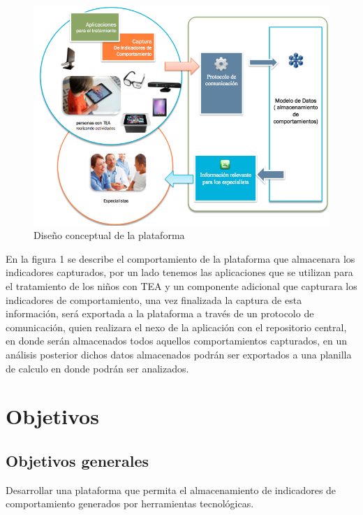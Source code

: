 \documentclass[12pt,letterpaper]{article}
\begin{document}
\begin{figure}[htb]
\begin{center}
\includegraphics[width=15cm]{mono.png}
\end{center}
\caption{Dise\~no conceptual de la plataforma}
\end{figure}

En la figura 1 se describe el comportamiento de la plataforma que almacenara los 
indicadores capturados,  por un lado tenemos las aplicaciones que se utilizan para 
el tratamiento de los ni\~nos con TEA y un componente adicional que capturara los 
indicadores de comportamiento, una vez finalizada la captura de esta informaci\'on, 
ser\'a exportada a la plataforma a trav\'es de un protocolo de comunicaci\'on, quien 
realizara el nexo de la aplicaci\'on con el repositorio central, en donde ser\'an 
almacenados todos aquellos comportamientos capturados, en un an\'alisis 
posterior dichos datos almacenados podr\'an ser exportados a una planilla de
 calculo en donde podr\'an ser analizados. 

\section{Objetivos}
\label{obj}

\subsection{Objetivos generales}
Desarrollar una plataforma que permita el almacenamiento de indicadores de comportamiento 
generados por herramientas tecnol\'ogicas.
\end{document}
